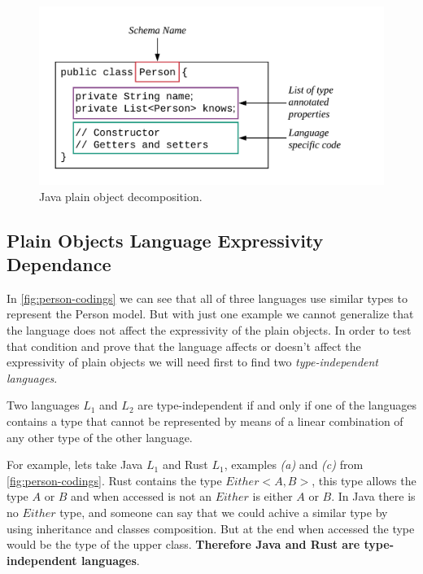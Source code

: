 \begin{figure}
    \includegraphics[scale=0.2]{images/java-analysis.png}
    \centering
    \caption[Java plain object decomposition.]{Java plain object decomposition.}
    \label{fig:java-analysis}
\end{figure}

\subsection{Plain Objects Language Expressivity Dependance}
In \cref{fig:person-codings} we can see that all of three languages use similar types to represent the Person model. But with
just one example we cannot generalize that the language does not affect the expressivity of the plain objects. In order to
test that condition and prove that the language affects or doesn't affect the expressivity of plain objects we will need first
to find two \textit{type-independent languages}.

\begin{definition}
    Two languages $L_1$ and $L_2$ are type-independent if and only if one of the languages contains a type that cannot be
    represented by means of a linear combination of any other type of the other language.
\end{definition}

For example, lets take Java \textit{$L_1$} and Rust \textit{$L_1$}, examples \textit{(a)} and \textit{(c)} from \cref{fig:person-codings}.
Rust contains the type $Either<A,B>$, this type allows the type $A$ or $B$ and when accessed is not an $Either$ is either $A$ or $B$. In
Java there is no $Either$ type, and someone can say that we could achive a similar type by using inheritance and classes composition. But
at the end when accessed the type would be the type of the upper class. \textbf{Therefore Java and Rust are type-independent languages}.

